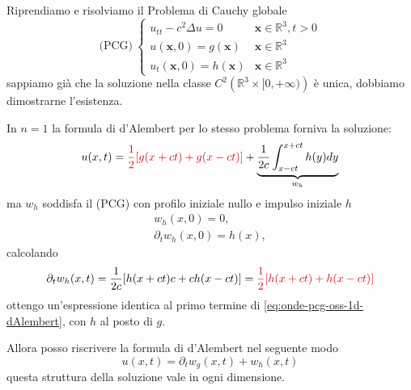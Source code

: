 \documentclass[10pt,a4paper,twoside,openright]{book}
\begin{document}
Riprendiamo e risolviamo il Problema di Cauchy globale
\begin{equation*}
	\text{(PCG)} \ 
	\begin{cases}
		u_{tt} -c^{2} \Delta u=0            & \mathbf{x} \in \mathbb{R}^{3} ,t >0 \\
		u(\mathbf{x} ,0) =g(\mathbf{x})     & \mathbf{x}\mathbb{\in R}^{3}        \\
		u_{t}(\mathbf{x} ,0) =h(\mathbf{x}) & \mathbf{x}\mathbb{\in R}^{3}        
	\end{cases}
\end{equation*}
sappiamo già che la soluzione nella classe $\displaystyle C^{2}\left(\mathbb{R}^{3} \times [ 0,+\infty )\right)$ è unica, dobbiamo dimostrarne l'esistenza.
\begin{oss}
	In $\displaystyle n=1$ la formula di d'Alembert per lo stesso problema forniva la soluzione:
	\begin{equation}
		u( x,t) =\textcolor[rgb]{0.82,0.01,0.11}{\frac{1}{2}[g(x+ct)+g(x-ct)]} +\underbrace{\frac{1}{2c}\int _{x-ct}^{x+ct} h( y) dy}_{w_{h}}
		\label{eq:onde-pcg-oss-1d-dAlembert}
	\end{equation}
	ma $\displaystyle w_{h}$ soddisfa il (PCG) con profilo iniziale nullo e impulso iniziale $\displaystyle h$
	\begin{gather*}
		w_{h}( x,0) =0,\\
		\partial _{t} w_{h}( x,0) =h( x) ,
	\end{gather*}
	calcolando
	\begin{equation*}
		\partial _{t} w_{h}( x,t) =\frac{1}{2c}[ h( x+ct) c+ch( x-ct)] =\textcolor[rgb]{0.82,0.01,0.11}{\frac{1}{2}[h(x+ct)+h(x-ct)]}
	\end{equation*}
	ottengo un'espressione identica al primo termine di \eqref{eq:onde-pcg-oss-1d-dAlembert}, con $\displaystyle h$ al posto di $\displaystyle g$.
	
	Allora posso riscrivere la formula di d'Alembert nel seguente modo
	\begin{equation*}
		u( x,t) =\partial _{t} w_{g}( x,t) +w_{h}( x,t)
	\end{equation*}
	questa struttura della soluzione vale in ogni dimensione.
\end{oss}
\end{document}
